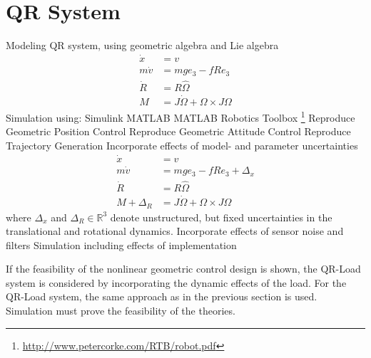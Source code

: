 \section{QR System}
\begin{outline}
\1 Modeling QR system, using geometric algebra and Lie algebra
\begin{align}
	\dot{x}&=v\\
	m\dot{v}&=mge_3-fRe_3\\
	\dot{R}&=R\hat{\Omega}\\
	M&=J\dot{\Omega}+\Omega\times J\Omega
\end{align} 
\1 Simulation using:
\2 Simulink
\2 MATLAB
\2 MATLAB Robotics Toolbox \footnote{\url{http://www.petercorke.com/RTB/robot.pdf}}												
\1 Reproduce Geometric Position Control							
\1 Reproduce Geometric Attitude Control	
\1 Reproduce Trajectory Generation
\1 Incorporate effects of model- and parameter uncertainties
\begin{align}
\dot{x}&=v\\
m\dot{v}&=mge_3-fRe_3+\Delta_x\\
\dot{R}&=R\hat{\Omega}\\
M+\Delta_R&=J\dot{\Omega}+\Omega\times J\Omega
\end{align} 
where $ \Delta_x $ and $ \Delta_R \in\mathbb{R}^3$ denote unstructured, but fixed uncertainties in the translational and rotational dynamics.
\1 Incorporate effects of sensor noise and filters							
\1 Simulation including effects of implementation
\end{outline}						

If the feasibility of the nonlinear geometric control design is shown, the QR-Load system is considered by incorporating the dynamic effects of the load. 
For the QR-Load system, the same approach as in the previous section is used. Simulation must prove the feasibility of the theories.
